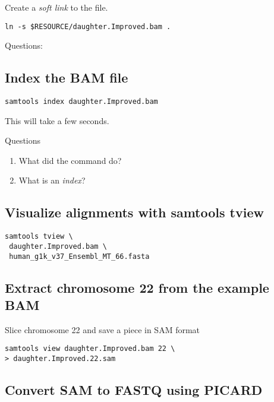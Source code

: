 \documentclass{article}
\begin{document}
Create a {\em soft link} to the file.

\begin{verbatim}
ln -s $RESOURCE/daughter.Improved.bam .
\end{verbatim}
Questions:
\subsection{Index the BAM file}
\begin{verbatim}
samtools index daughter.Improved.bam
\end{verbatim}
This will take a few seconds. 

Questions
\begin{enumerate}
\item  What did the command do? 
\item What is an {\em index}?
\end{enumerate}
\subsection{Visualize alignments with samtools tview }
\begin{verbatim}
samtools tview \
 daughter.Improved.bam \
 human_g1k_v37_Ensembl_MT_66.fasta
\end{verbatim}

\subsection{Extract chromosome 22 from the example BAM}
Slice chromosome 22 and save a piece in SAM format
\begin{verbatim}
samtools view daughter.Improved.bam 22 \
> daughter.Improved.22.sam
\end{verbatim}

\subsection{Convert SAM to FASTQ using PICARD}
\end{document}
